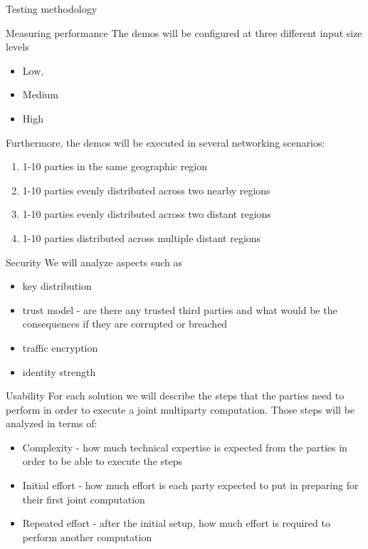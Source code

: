 \begin{frame}{Testing methodology}
\begin{block}{Measuring performance}
The demos will be configured at three different input size levels

\begin{itemize}
\tightlist
\item
  Low,
\item
  Medium
\item
  High
\end{itemize}

Furthermore, the demos will be executed in several networking scenarios:

\begin{enumerate}
\tightlist
\item
  1-10 parties in the same geographic region
\item
  1-10 parties evenly distributed across two nearby regions
\item
  1-10 parties evenly distributed across two distant regions
\item
  1-10 parties distributed across multiple distant regions
\end{enumerate}
\end{block}

\begin{block}{Security}
\protect\hypertarget{security}{}
We will analyze aspects such as

\begin{itemize}
\tightlist
\item
  key distribution
\item
  trust model - are there any trusted third parties and what would be
  the consequences if they are corrupted or breached
\item
  traffic encryption
\item
  identity strength
\end{itemize}
\end{block}

\begin{block}{Usability}
\protect\hypertarget{usability}{}
For each solution we will describe the steps that the parties need to
perform in order to execute a joint multiparty computation. Those steps
will be analyzed in terms of:

\begin{itemize}
\tightlist
\item
  Complexity - how much technical expertise is expected from the parties
  in order to be able to execute the steps
\item
  Initial effort - how much effort is each party expected to put in
  preparing for their first joint computation
\item
  Repeated effort - after the initial setup, how much effort is required
  to perform another computation


\end{itemize}
\end{block}
\end{frame}
